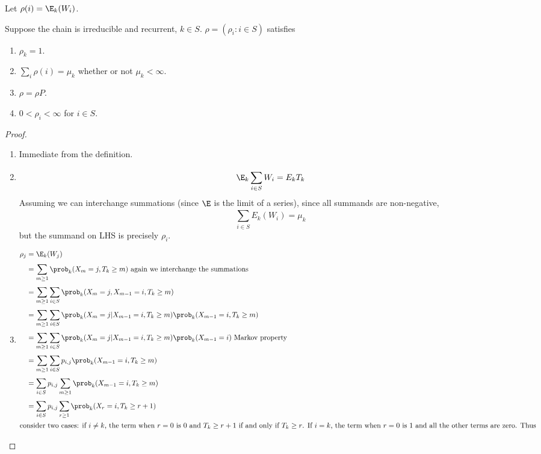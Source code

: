 \documentclass[a4paper]{article}
\begin{document}
Let \(\rho(i) = \E_k(W_i)\).

\begin{proposition}
  Suppose the chain is irreducible and recurrent, \(k \in S\). \(\rho = (\rho_i: i \in S)\) satisfies
  \begin{enumerate}
  \item \(\rho_k = 1\).
  \item \(\sum_i \rho(i) = \mu_k\) whether or not \(\mu_k < \infty\).
  \item \(\rho = \rho P\).
  \item \(0 < \rho_i < \infty\) for \(i \in S\).
  \end{enumerate}
\end{proposition}

\begin{proof}\leavevmode
  \begin{enumerate}
  \item Immediate from the definition.
  \item
    \[
      \E_k \sum_{i \in S}^{ } W_i = E_k T_k
    \]
    Assuming we can interchange summations (since \(\E\) is the limit of a series), since all summands are non-negative,
    \[
      \sum_{i \in S}^{ } E_k(W_i) = \mu_k
    \]
    but the summand on LHS is precisely \(\rho_i\).
  \item
    \begin{align*}
      \rho_j &= \E_k(W_j) \\
             &= \sum_{m \geq 1}^{ } \prob_k(X_m = j, T_k \geq m) \text{ again we interchange the summations} \\
             &= \sum_{m \geq 1}^{ } \sum_{i \in S}^{ } \prob_k(X_m = j, X_{m - 1} = i, T_k \geq m) \\
             &= \sum_{m \geq 1}^{ } \sum_{i \in S}^{ } \prob_k(X_m = j| X_{m - 1} = i, T_k \geq m)\prob_k(X_{m - 1} = i, T_k \geq m) \\
             &= \sum_{m \geq 1}^{ } \sum_{i \in S}^{ } \prob_k(X_m = j| X_{m - 1} = i, T_k \geq m)\prob_k(X_{m - 1} = i) \text{ Markov property} \\
             &= \sum_{m \geq 1}^{ } \sum_{i \in S}^{ } p_{i,j} \prob_k(X_{m - 1} = i, T_k \geq m) \\
             &= \sum_{i \in S}^{ } p_{i,j} \sum_{m \geq 1}^{ } \prob_k(X_{m - 1} = i, T_k \geq m) \\
             &= \sum_{i \in S}^{ } p_{i,j} \sum_{r \geq 1}^{ } \prob_k(X_{r} = i, T_k \geq r + 1) \\
      \intertext{consider two cases: if \(i \neq k\), the term when \(r = 0\) is \(0\) and \(T_k \geq r + 1\) if and only if \(T_k \geq r\). If \(i = k\), the term when \(r = 0\) is \(1\) and all the other terms are zero. Thus}

\end{align*}
\end{enumerate}
\end{proof}
\end{document}
